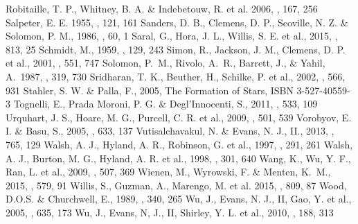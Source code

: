 \documentclass[iop]{emulateapj}
\begin{document}
\begin{thebibliography}{}
 Robitaille, T. P., Whitney, B. A. \& Indebetouw, R. et al. 2006, \apjs, 167, 256
 Salpeter, E. E. 1955, \apj, 121, 161
 Sanders, D. B., Clemens, D. P., Scoville, N. Z. \& Solomon, P. M., 1986, \apj, 60, 1
 Saral, G., Hora, J. L., Willis, S. E. et al., 2015, \apj, 813, 25
 Schmidt, M., 1959, \apj, 129, 243
 Simon, R., Jackson, J. M., Clemens, D. P. et al., 2001, \apj, 551, 747
 Solomon, P.~M., Rivolo, 
A.~R., Barrett, J., \& Yahil, A.\ 1987, \apj, 319, 730 
 Sridharan, T. K., Beuther, H., Schilke, P. et al., 2002, \apj, 566, 931
 Stahler, S. W. \& Palla, F., 2005, The Formation of Stars, ISBN 3-527-40559-3
 Tognelli, E., Prada Moroni, P. G. \& Degl'Innocenti, S., 2011, \aap, 533, 109
 Urquhart, J. S., Hoare, M. G., Purcell, C. R. et al., 2009, \aap, 501, 539
 Vorobyov, E. I. \&  Basu, S., 2005, \apj, 633, 137
 Vutisalchavakul, N. \& Evans, N. J., II., 2013, \apj, 765, 129
 Walsh, A. J., Hyland, A. R., Robinson, G. et al., 1997, \mnras, 291, 261
 Walsh, A. J., Burton, M. G., Hyland, A. R. et al., 1998, \mnras, 301, 640
 Wang, K., Wu, Y. F., Ran, L. et al., 2009, \aap, 507, 369
 Wienen, M., Wyrowski, F. \& Menten, K.~M., 2015, \aap, 579, 91
 Willis, S., Guzman, A., Marengo, M. et al. 2015, \apj, 809, 87
 Wood, D.O.S. \& Churchwell, E., 1989,  \apj, 340, 265
 Wu, J., Evans, N. J., II, Gao, Y. et al., 2005, \apjl, 635, 173
 Wu, J., Evans, N, J., II, Shirley, Y. L. et al., 2010, \apjs, 188, 313


\end{thebibliography}
\end{document}
